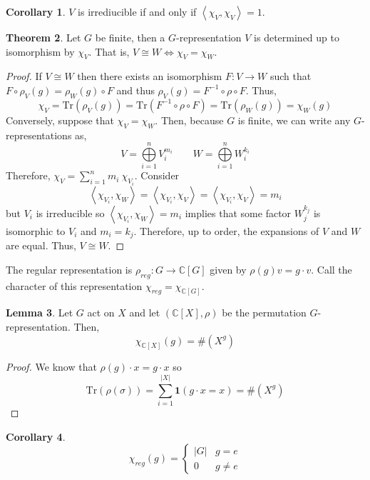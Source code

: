 \documentclass[12pt]{extarticle}
\newcommand{\C}{\mathbb{C}}
\newcommand{\tr}[1]{\mathrm{Tr} \! \left(#1\right)}
\newcommand{\inner}[2]{\left<#1, #2 \right>}
\theoremstyle{definition}
\newtheorem{theorem}{Theorem}[section]
\newtheorem{lemma}[theorem]{Lemma}
\newtheorem{corollary}[theorem]{Corollary}
\newenvironment{definition}[1][Definition:]{\begin{trivlist}
\item[\hskip \labelsep {\bfseries #1}]}{\end{trivlist}}
\begin{document}
\begin{corollary}
$V$ is irrediucible if and only if $\inner{\chi_V}{\chi_V} = 1$.
\end{corollary}

\begin{theorem}
Let $G$ be finite, then a $G$-representation $V$ is determined up to isomorphism by $\chi_V$. That is, $V \cong W \iff \chi_V = \chi_W$. 
\end{theorem}

\begin{proof}
If $V \cong W$ then there exists an isomorphism $F : V \to W$ such that $F \circ \rho_V(g) = \rho_W(g) \circ F$ and thus $\rho_V(g) = F^{-1} \circ \rho \circ F$. Thus, 
\[\chi_V = \tr{\rho_V(g)} = \tr{F^{-1} \circ \rho \circ F} = \tr{\rho_W(g)} = \chi_W(g)\]
Conversely, suppose that $\chi_V = \chi_W$. Then, because $G$ is finite, we can write any $G$-representations as,
\[V = \bigoplus\limits_{i = 1}^n V_i^{m_i} \quad \quad W = \bigoplus\limits_{i = 1}^n W_i^{k_i}\]
Therefore, $\chi_V = \sum\limits_{i = 1}^n m_i \: \chi_{V_i}$. Consider
\[ \inner{\chi_{V_i}}{\chi_W} = \inner{\chi_{V_i}}{\chi_{V}} = \inner{\chi_{V_i}}{\chi_{V}} = m_i\]
but $V_i$ is irreducible so $\inner{\chi_{V_i}}{\chi_W} = m_i$ implies that some factor $W_j^{k_j}$ is isomorphic to $V_i$ and $m_i = k_j$. Therefore, up to order, the expansions of $V$ and $W$ are equal. Thus, $V \cong W$. 
\end{proof}

\begin{definition}
The regular representation is $\rho_{reg} : G \to \C[G]$ given by $\rho(g) v = g \cdot v$. Call the character of this representation $\chi_{reg} = \chi_{\C[G]}$.
\end{definition}

\begin{lemma}
Let $G$ act on $X$ and let $(\C[X], \rho)$ be the permutation $G$-representation. Then,
\[\chi_{\C[X]}(g) = \#(X^g)\]
\end{lemma}

\begin{proof}
We know that $\rho(g) \cdot x = g \cdot x$ so
\[\tr{\rho(\sigma)} = \sum_{i = 1}^{|X|} \mathbf{1}(g \cdot x = x) = \#(X^g)\]
\end{proof}

\begin{corollary}
\[\chi_{reg}(g) =
\begin{cases}
|G| & g = e \\
0 & g \neq e
\end{cases}\] 
\end{corollary}
\end{document}
